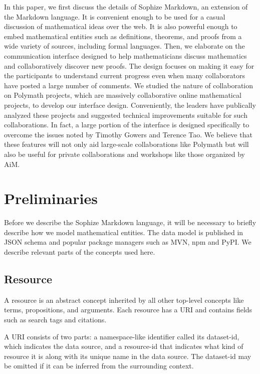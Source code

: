 \documentclass[a4paper]{article}
\begin{document}
In this paper, we first discuss the details of Sophize Markdown, an extension of the Markdown language. It is convenient enough to be used for a casual discussion of mathematical ideas over the web. It is also powerful enough to embed mathematical entities such as definitions, theorems, and proofs from a wide variety of sources, including formal languages. Then, we elaborate on the communication interface designed to help mathematicians discuss mathematics and collaboratively discover new proofs. The design focuses on making it easy for the participants to understand current progress even when many collaborators have posted a large number of comments. We studied the nature of collaboration on Polymath projects\cite{polymath_blog}, which are massively collaborative online mathematical projects, to develop our interface design. Conveniently, the leaders have publically analyzed these projects and suggested technical improvements suitable for such collaborations. In fact, a large portion of the interface is designed specifically to overcome the issues noted by Timothy Gowers \cite{gowers_weblog_2009} and Terence Tao\cite{whats_new_2009}. We believe that these features will not only aid large-scale collaborations like Polymath but will also be useful for private collaborations and workshops like those organized by AiM.



\section{Preliminaries}


Before we describe the Sophize Markdown language, it will be necessary to briefly describe how we model mathematical entities. The data model is published in JSON schema\cite{sophize_datamodel} and popular package managers such as MVN, npm and PyPI. We describe relevant parts of the concepts used here.


\subsection*{Resource}

A resource is an abstract concept inherited by all other top-level concepts like terms, propositions, and arguments. Each resource has a URI and contains fields such as search tags and citations.


A URI consists of two parts: a namespace-like identifier called its dataset-id, which indicates the data source, and a resource-id that indicates what kind of resource it is along with its unique name in the data source. The dataset-id may be omitted if it can be inferred from the surrounding context.
\end{document}

